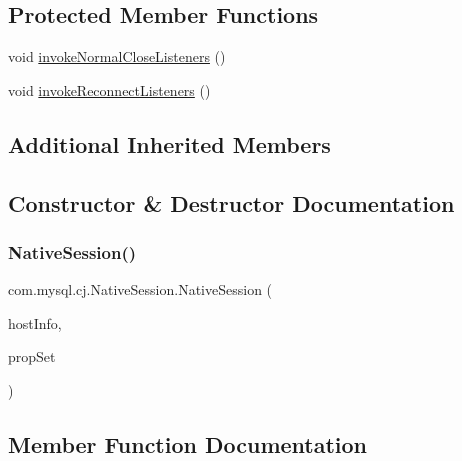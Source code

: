 \subsection*{Protected Member Functions}
\begin{DoxyCompactItemize}
\item 
void \mbox{\hyperlink{classcom_1_1mysql_1_1cj_1_1_native_session_a45be4388be1b0857ee28cbf16c1862be}{invoke\+Normal\+Close\+Listeners}} ()
\item 
void \mbox{\hyperlink{classcom_1_1mysql_1_1cj_1_1_native_session_a543b86fad6252601b0b2ebb0dc466cdf}{invoke\+Reconnect\+Listeners}} ()
\end{DoxyCompactItemize}
\subsection*{Additional Inherited Members}


\subsection{Constructor \& Destructor Documentation}
\mbox{\label{classcom_1_1mysql_1_1cj_1_1_native_session_a054304603392a1cddd310ad3bbf02084}} 
\subsubsection{\texorpdfstring{Native\+Session()}{NativeSession()}}
{\footnotesize\ttfamily com.\+mysql.\+cj.\+Native\+Session.\+Native\+Session (\begin{DoxyParamCaption}\item[{\mbox{\hyperlink{classcom_1_1mysql_1_1cj_1_1conf_1_1_host_info}{Host\+Info}}}]{host\+Info,  }\item[{\mbox{\hyperlink{interfacecom_1_1mysql_1_1cj_1_1conf_1_1_property_set}{Property\+Set}}}]{prop\+Set }\end{DoxyParamCaption})}



\subsection{Member Function Documentation}
\mbox{\label{classcom_1_1mysql_1_1cj_1_1_native_session_af9c9459689e10e1f44ef81395080bc36}} 
